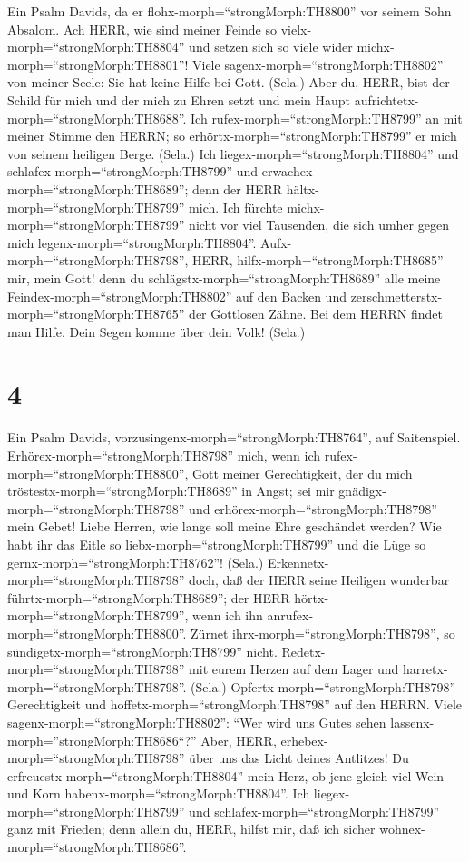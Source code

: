  Ein Psalm Davids, da er flohx-morph=``strongMorph:TH8800''
vor seinem Sohn Absalom. Ach HERR, wie sind meiner Feinde so
vielx-morph=``strongMorph:TH8804'' und setzen sich so viele wider
michx-morph=``strongMorph:TH8801''!  Viele
sagenx-morph=``strongMorph:TH8802'' von meiner Seele: Sie hat keine
Hilfe bei Gott. (Sela.)  Aber du, HERR, bist der Schild für
mich und der mich zu Ehren setzt und mein Haupt
aufrichtetx-morph=``strongMorph:TH8688''.  Ich
rufex-morph=``strongMorph:TH8799'' an mit meiner Stimme den HERRN; so
erhörtx-morph=``strongMorph:TH8799'' er mich von seinem heiligen Berge.
(Sela.)  Ich liegex-morph=``strongMorph:TH8804'' und
schlafex-morph=``strongMorph:TH8799'' und
erwachex-morph=``strongMorph:TH8689''; denn der HERR
hältx-morph=``strongMorph:TH8799'' mich.  Ich fürchte
michx-morph=``strongMorph:TH8799'' nicht vor viel Tausenden, die sich
umher gegen mich legenx-morph=``strongMorph:TH8804''. 
Aufx-morph=``strongMorph:TH8798'', HERR,
hilfx-morph=``strongMorph:TH8685'' mir, mein Gott! denn du
schlägstx-morph=``strongMorph:TH8689'' alle meine
Feindex-morph=``strongMorph:TH8802'' auf den Backen und
zerschmetterstx-morph=``strongMorph:TH8765'' der Gottlosen Zähne.
 Bei dem HERRN findet man Hilfe. Dein Segen komme über dein
Volk! (Sela.)

\hypertarget{section-3}{%
\section{4}\label{section-3}}

 Ein Psalm Davids,
vorzusingenx-morph=``strongMorph:TH8764'', auf Saitenspiel.
Erhörex-morph=``strongMorph:TH8798'' mich, wenn ich
rufex-morph=``strongMorph:TH8800'', Gott meiner Gerechtigkeit, der du
mich tröstestx-morph=``strongMorph:TH8689'' in Angst; sei mir
gnädigx-morph=``strongMorph:TH8798'' und
erhörex-morph=``strongMorph:TH8798'' mein Gebet!  Liebe
Herren, wie lange soll meine Ehre geschändet werden? Wie habt ihr das
Eitle so liebx-morph=``strongMorph:TH8799'' und die Lüge so
gernx-morph=``strongMorph:TH8762''! (Sela.) 
Erkennetx-morph=``strongMorph:TH8798'' doch, daß der HERR seine Heiligen
wunderbar führtx-morph=``strongMorph:TH8689''; der HERR
hörtx-morph=``strongMorph:TH8799'', wenn ich ihn
anrufex-morph=``strongMorph:TH8800''.  Zürnet
ihrx-morph=``strongMorph:TH8798'', so
sündigetx-morph=``strongMorph:TH8799'' nicht.
Redetx-morph=``strongMorph:TH8798'' mit eurem Herzen auf dem Lager und
harretx-morph=``strongMorph:TH8798''. (Sela.) 
Opfertx-morph=``strongMorph:TH8798'' Gerechtigkeit und
hoffetx-morph=``strongMorph:TH8798'' auf den HERRN.  Viele
sagenx-morph=``strongMorph:TH8802'': ``Wer wird uns Gutes sehen
lassenx-morph=''strongMorph:TH8686``?'' Aber, HERR,
erhebex-morph=``strongMorph:TH8798'' über uns das Licht deines
Antlitzes!  Du erfreuestx-morph=``strongMorph:TH8804'' mein
Herz, ob jene gleich viel Wein und Korn
habenx-morph=``strongMorph:TH8804''.  Ich
liegex-morph=``strongMorph:TH8799'' und
schlafex-morph=``strongMorph:TH8799'' ganz mit Frieden; denn allein du,
HERR, hilfst mir, daß ich sicher wohnex-morph=``strongMorph:TH8686''.


